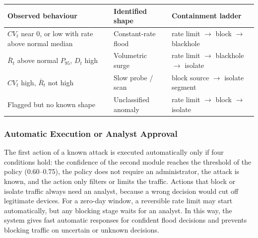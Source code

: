 \documentclass[]{interact}
\theoremstyle{plain}%
\theoremstyle{definition}
\theoremstyle{remark}
\begin{document}
\begin{table}[htbp]
{\begin{tabular}{lll}
\toprule
Observed behaviour & Identified shape & Containment ladder \\
\midrule
$CV_t$ near 0, or low with rate above normal median & Constant-rate flood & rate limit $\rightarrow$ block $\rightarrow$ blackhole \\
$\bar{R}_t$ above normal $P_{95}$, $D_t$ high & Volumetric surge & rate limit $\rightarrow$ blackhole $\rightarrow$ isolate \\
$CV_t$ high, $\bar{R}_t$ not high & Slow probe / scan & block source $\rightarrow$ isolate segment \\
Flagged but no known shape & Unclassified anomaly & rate limit $\rightarrow$ block $\rightarrow$ isolate \\
\bottomrule
\end{tabular}}
\label{tab:shape}
\end{table}

\subsubsection{Automatic Execution or Analyst Approval}
The first action of a known attack is executed automatically only if four conditions hold: the confidence of the second module reaches the threshold of the policy (0.60--0.75), the policy does not require an administrator, the attack is known, and the action only filters or limits the traffic. Actions that block or isolate traffic always need an analyst, because a wrong decision would cut off legitimate devices. For a zero-day window, a reversible rate limit may start automatically, but any blocking stage waits for an analyst. In this way, the system gives fast automatic responses for confident flood decisions and prevents blocking traffic on uncertain or unknown decisions.
\end{document}
